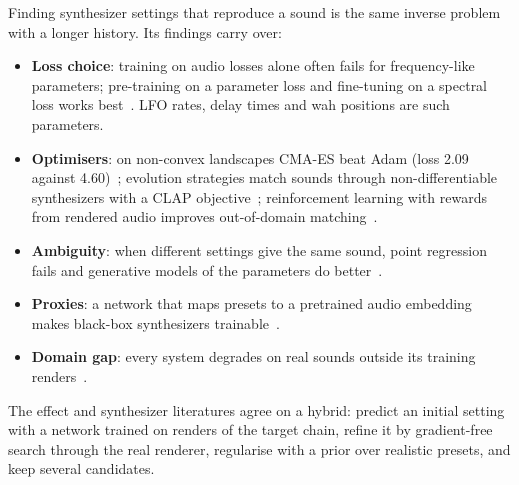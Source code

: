 Finding synthesizer settings that reproduce a sound is the same inverse problem
with a longer history. Its findings carry over:
\begin{itemize}
\item \textbf{Loss choice}: training on audio losses alone often fails for
  frequency-like parameters; pre-training on a parameter loss and fine-tuning on
  a spectral loss works best~\cite{masuda2021ddsp,uzrad2024diffmoog}. LFO rates,
  delay times and wah positions are such parameters.
\item \textbf{Optimisers}: on non-convex landscapes CMA-ES beat Adam (loss 2.09
  against 4.60)~\cite{bogdan2026instrumental}; evolution strategies match sounds
  through non-differentiable synthesizers with a CLAP objective~\cite{cherep2024ctag};
  reinforcement learning with rewards from rendered audio improves
  out-of-domain matching~\cite{wu2026ddsynthrl}.
\item \textbf{Ambiguity}: when different settings give the same sound, point
  regression fails and generative models of the parameters do
  better~\cite{hayes2025equivariant}.
\item \textbf{Proxies}: a network that maps presets to a pretrained audio
  embedding makes black-box synthesizers trainable~\cite{combes2025proxies}.
\item \textbf{Domain gap}: every system degrades on real sounds outside its
  training renders~\cite{hayes2024review}.
\end{itemize}

\begin{keyidea}
The effect and synthesizer literatures agree on a hybrid: predict an initial
setting with a network trained on renders of the target chain, refine it by
gradient-free search through the real renderer, regularise with a prior over
realistic presets, and keep several candidates.
\end{keyidea}
